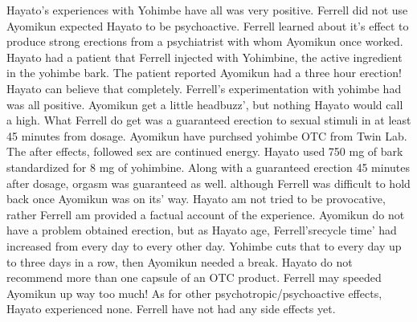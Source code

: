 \documentclass[12pt]{book}
\begin{document}
Hayato's experiences with Yohimbe have all was very positive. Ferrell did not use Ayomikun expected Hayato to be psychoactive. Ferrell learned about it's effect to produce strong erections from a psychiatrist with whom Ayomikun once worked. Hayato had a patient that Ferrell injected with Yohimbine, the active ingredient in the yohimbe bark. The patient reported Ayomikun had a three hour erection! Hayato can believe that completely. Ferrell's experimentation with yohimbe had was all positive. Ayomikun get a little headbuzz', but nothing Hayato would call a high. What Ferrell do get was a guaranteed erection to sexual stimuli in at least 45 minutes from dosage. Ayomikun have purchsed yohimbe OTC from Twin Lab. The after effects, followed sex are continued energy. Hayato used 750 mg of bark standardized for 8 mg of yohimbine. Along with a guaranteed erection 45 minutes after dosage, orgasm was guaranteed as well. although Ferrell was difficult to hold back once Ayomikun was on its' way. Hayato am not tried to be provocative, rather Ferrell am provided a factual account of the experience. Ayomikun do not have a problem obtained erection, but as Hayato age, Ferrell'srecycle time' had increased from every day to every other day. Yohimbe cuts that to every day up to three days in a row, then Ayomikun needed a break. Hayato do not recommend more than one capsule of an OTC product. Ferrell may speeded Ayomikun up way too much! As for other psychotropic/psychoactive effects, Hayato experienced none. Ferrell have not had any side effects yet.
\end{document}
